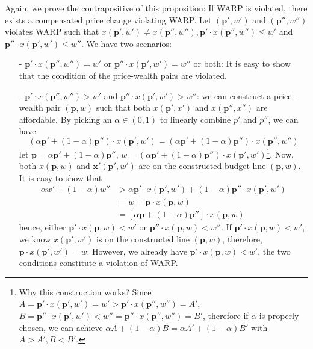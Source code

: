 \begin{description}
    Again, we prove the contrapositive of this proposition: If WARP is violated, there exists a compensated price change violating WARP. Let $(\mathbf{p}',w')$ and $(\mathbf{p}'',w'')$ violates WARP such that $ x(\mathbf{p}',w')\neq  x(\mathbf{p}'',w''),\mathbf{p}'\cdot x(\mathbf{p}'',w'')\leq w'$ and $\mathbf{p}''\cdot x(\mathbf{p}',w')\leq w''$. We have two scenarios:
    \begin{enumerate}
        \item[-] $\mathbf{p}'\cdot x(\mathbf{p}'',w'')= w'$ or $\mathbf{p}''\cdot x(\mathbf{p}',w')= w''$ or both: It is easy to show that the condition of the price-wealth pairs are violated.
        \item[-] $\mathbf{p}'\cdot x(\mathbf{p}'',w'')> w'$ and $\mathbf{p}''\cdot x(\mathbf{p}',w')>w''$: we can construct a price-wealth pair $(\mathbf{p},w)$ such that both $ x(\mathbf{p}',x')$ and $ x(\mathbf{p}'',x'')$ are affordable. By picking an $\alpha \in (0,1)$ to linearly combine $p'$ and $p''$, we can have:
        $$(\alpha \mathbf{p}'+(1-\alpha)\mathbf{p}'')\cdot  x(\mathbf{p}',w')= (\alpha \mathbf{p}'+(1-\alpha)\mathbf{p}'')\cdot  x(\mathbf{p}'',w'')$$
        let $\mathbf{p}=\alpha \mathbf{p}'+(1-\alpha)\mathbf{p}''$, $w=(\alpha \mathbf{p}'+(1-\alpha)\mathbf{p}'')\cdot  x(\mathbf{p}',w')$\footnote{Why this construction works? Since $A = \mathbf{p}'\cdot  x(\mathbf{p}',w')= w'> \mathbf{p}'\cdot  x(\mathbf{p}'',w'')=A'$, $B=\mathbf{p}''\cdot  x(\mathbf{p}',w')<w''= \mathbf{p}''\cdot  x(\mathbf{p}'',w'')=B'$, therefore if $\alpha$ is properly chosen, we can achieve $\alpha A+(1-\alpha)B = \alpha A'+(1-\alpha) B'$ with $A>A',B<B'$.}.
         Now, both $ x(\mathbf{p},w)$ and $\mathbf{x}'(\mathbf{p}',w')$ are on the constructed budget line $(\mathbf{p},w)$. It is easy to show that
        \begin{align*}
            \alpha w'+(1-\alpha)w'' &> \alpha \mathbf{p}'\cdot x(\mathbf{p}',w')+(1-\alpha) \mathbf{p}''\cdot  x(\mathbf{p}',w') \\
            & = w=\mathbf{p}\cdot  x(\mathbf{p},w)\\
            & = \left[ \alpha \mathbf{p}+(1-\alpha) \mathbf{p}''\right]\cdot  x(\mathbf{p},w)
        \end{align*}
        hence, either $\mathbf{p}'\cdot  x(\mathbf{p},w)<w'$ or $\mathbf{p}''\cdot  x(\mathbf{p},w)<w''$. If $\mathbf{p}'\cdot x(\mathbf{p},w)<w'$, we know $ x(\mathbf{p}',w')$ is on the constructed line $(\mathbf{p},w)$, therefore, $\mathbf{p}\cdot  x(\mathbf{p}',w')=w$. However, we already have $\mathbf{p}'\cdot  x(\mathbf{p},w)<w'$, the two conditions constitute a violation of WARP.
    \end{enumerate} 


\end{description}
